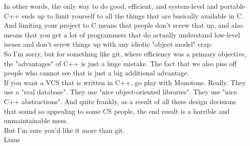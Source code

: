 In other words, the only way to do good, efficient, and system-level and
portable C++ ends up to limit yourself to all the things that are
basically available in C. And limiting your project to C means that people
don't screw that up, and also means that you get a lot of programmers that
do actually understand low-level issues and don't screw things up with any
idiotic "object model" crap.\\

So I'm sorry, but for something like git, where efficiency was a primary
objective, the "advantages" of C++ is just a huge mistake. The fact that
we also piss off people who cannot see that is just a big additional
advantage.\\

If you want a VCS that is written in C++, go play with Monotone. Really.
They use a "real database". They use "nice object-oriented libraries".
They use "nice C++ abstractions". And quite frankly, as a result of all
these design decisions that sound so appealing to some CS people, the end
result is a horrible and unmaintainable mess.\\

But I'm sure you'd like it more than git.\\

			Linus 
